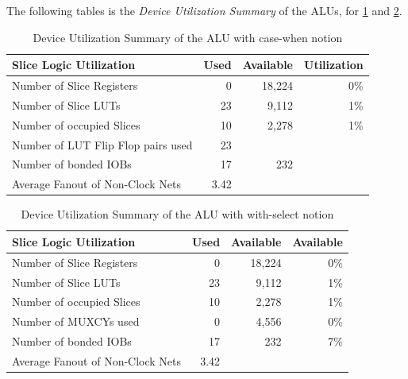 \documentclass{article}
\begin{document}
    The following tables is the \textit{Device Utilization Summary} of the ALUs, for \ref{tab:rtl:cw} and \ref{tab:rtl:ws}.
    \begin{table}[h!]
        \centering
        \begin{tabular}{|l|r|r|r|}
            \hline Slice Logic Utilization & Used & Available & Utilization \\ 
            \hline Number of Slice Registers & 0
            & 18,224
            & 0\%
            \\ 
            \hline Number of Slice LUTs & 23
            & 9,112
            & 1\% \\ 
            \hline Number of occupied Slices & 10
            & 2,278 & 1\%
            \\ 
            \hline Number of LUT Flip Flop pairs used & 23
            &  &  \\ 
            \hline Number of bonded IOBs & 17
            & 232
            &  \\ 
            \hline Average Fanout of Non-Clock Nets & 3.42
            &  &  \\ 
            \hline 
        \end{tabular} 
        \caption{Device Utilization Summary of the ALU with case-when notion}
        \label{tab:rtl:cw}
    \end{table}
    \begin{table}[h!]
        \centering
        \begin{tabular}{|l|r|r|r|}
            \hline Slice Logic Utilization & Used & Available & Available \\ 
            \hline Number of Slice Registers & 0 & 18,224 & 0\% \\ 
            \hline Number of Slice LUTs & 23 & 9,112 & 1\% \\ 
            \hline Number of occupied Slices & 10 & 2,278 & 1\% \\ 
            \hline Number of MUXCYs used & 0 & 4,556 & 0\% \\ 
            \hline Number of bonded IOBs & 17 & 232 & 7\% \\ 
            \hline Average Fanout of Non-Clock Nets & 3.42
            &  &  \\ 
            \hline 
        \end{tabular} 
        \caption{Device Utilization Summary of the ALU with with-select notion}
        \label{tab:rtl:ws}
    \end{table}
   
\end{document}
